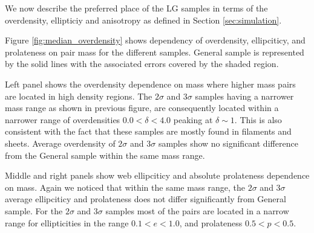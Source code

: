 \documentclass{emulateapj}
\begin{document}
We now describe the preferred place of the LG samples in terms of the
overdensity, ellipticiy and anisotropy as defined in Section
\ref{sec:simulation}. 

Figure \ref{fig:median_overdensity} shows dependency of overdensity,
ellipciticy, and prolateness on pair mass for the different samples.
General sample is represented by the solid lines with the associated 
errors covered by the shaded region. 

Left panel shows the overdensity dependence on mass where higher mass
pairs are located in high density regions.
The $2\sigma$ and $3\sigma$ samples having a narrower mass range as 
shown in previous figure, are consequently located within a narrower 
range of overdensities $0.0<\delta<4.0$ peaking at $\delta \sim 1$. 
This is also consistent with the fact that these samples are mostly 
found in filaments and sheets. 
Average overdensity of $2\sigma$ and $3\sigma$ samples show no 
significant difference from the General sample within the same mass 
range.  


Middle and right panels show web ellipciticy and absolute prolateness
dependence on mass. Again we noticed that within the same mass range,
the $2\sigma$ and $3\sigma$ average ellipciticy and prolateness does not
differ significantly from General sample.
For the $2\sigma$ and $3\sigma$ samples most of the pairs are located
in a narrow range for ellipticities in the range $0.1<e<1.0$, and
prolateness $0.5<p<0.5$.

\end{document}

